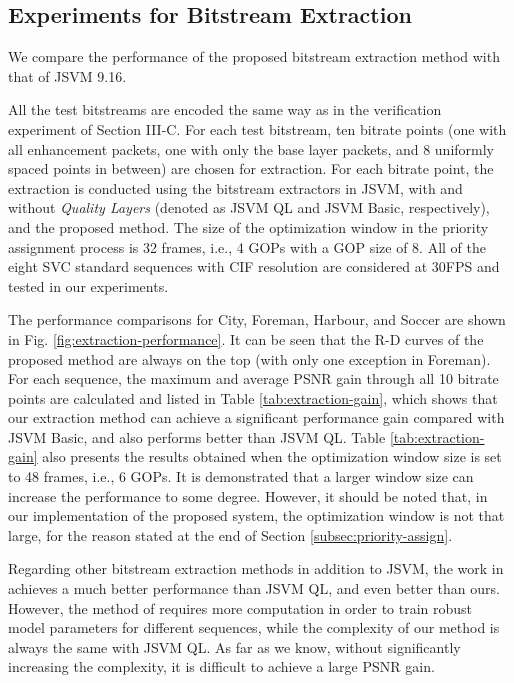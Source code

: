 \documentclass[journal]{IEEEtran}
\begin{document}
\subsection{Experiments for Bitstream Extraction}
\label{subsec:exp-extraction}

We compare the performance of the proposed bitstream extraction method with that of JSVM 9.16.

All the test bitstreams are encoded the same way as in the verification experiment of Section III-C. For each test bitstream, ten bitrate points (one with all enhancement packets, one with only the base layer packets, and 8 uniformly spaced points in between) are chosen for extraction. For each bitrate point, the extraction is conducted using the bitstream extractors in JSVM, with and without \textit{Quality Layers} (denoted as JSVM QL and JSVM Basic, respectively), and the proposed method. The size of the optimization window in the priority assignment process is 32 frames, i.e., 4 GOPs with a GOP size of 8. All of the eight SVC standard sequences with CIF resolution are considered at 30FPS and tested in our experiments.

The performance comparisons for City, Foreman, Harbour, and Soccer are shown in Fig. \ref{fig:extraction-performance}. It can be seen that the R-D curves of the proposed method are always on the top (with only one exception in Foreman). For each sequence, the maximum and average PSNR gain through all 10 bitrate points are calculated and listed in Table \ref{tab:extraction-gain}, which shows that our extraction method can achieve a significant performance gain compared with JSVM Basic, and also performs better than JSVM QL. Table \ref{tab:extraction-gain} also presents the results obtained when the optimization window size is set to 48 frames, i.e., 6 GOPs. It is demonstrated that a larger window size can increase the performance to some degree. However, it should be noted that, in our implementation of the proposed system, the optimization window is not that large, for the reason stated at the end of Section \ref{subsec:priority-assign}.

Regarding other bitstream extraction methods in addition to JSVM, the work in \cite{Maani09} achieves a much better performance than JSVM QL, and even better than ours. However, the method of \cite{Maani09} requires more computation in order to train robust model parameters for different sequences, while the complexity of our method is always the same with JSVM QL. As far as we know, without significantly increasing the complexity, it is difficult to achieve a large PSNR gain.
\end{document}
